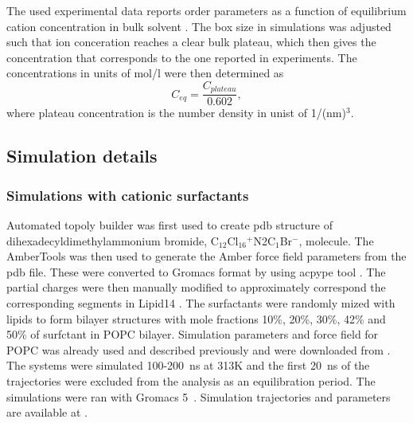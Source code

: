 \documentclass[aip,jcp,twocolumn]{revtex4}
\begin{document}
The used experimental data reports order parameters as a function of
equilibrium cation concentration in bulk solvent \cite{akutsu81,altenbach84}.
The box size in simulations was adjusted such that ion conceration reaches 
a clear bulk plateau, which then gives the concentration that corresponds to the
one reported in experiments. The concentrations in units of mol/l were then 
determined as
\begin{equation}
  C_{eq}=\frac{C_{plateau}}{0.602},
\end{equation}
where plateau concentration is the number density in unist of 1/(nm)$^3$.

\subsection{Simulation details}



\subsubsection{Simulations with cationic surfactants}
Automated topoly builder \cite{malde11} was first used to create pdb structure of
dihexadecyldimethylammonium bromide, C$_{12}$Cl$_{16}$$^+$N2C$_1$Br$^-$, molecule.
The AmberTools \cite{amber} was then used to generate the Amber force field
parameters from the pdb file. These were converted to Gromacs format by using
acpype tool \cite{acpype}. The partial charges were then manually modified
to approximately correspond the corresponding segments in Lipid14 \cite{dickson14}.
The surfactants were randomly mized with lipids to form bilayer structures with
mole fractions 10\%, 20\%, 30\%, 42\% and 50\% of surfctant in POPC bilayer.
Simulation parameters and force field for POPC was already used and
described previously \cite{catte16} and were downloaded from \cite{lipid14POPC0mMNaClfiles}.
The systems were simulated 100-200~ns at 313K and the first 20~ns of the trajectories
were excluded from the analysis as an equilibration period.
The simulations were ran with Gromacs 5~\cite{abraham15}. 
Simulation trajectories and parameters are available at \cite{??} .
\end{document}
